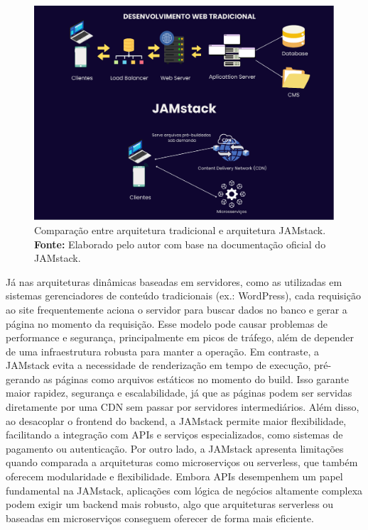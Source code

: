 \begin{figure}[H]
    \centering
    \includegraphics[height=8cm, keepaspectratio]{img/arquitetura/JAM STACK.png}
    \caption{ Comparação entre arquitetura tradicional e arquitetura JAMstack. \\
        \textbf{Fonte:} Elaborado pelo autor com base na documentação oficial do JAMstack.}
    \label{fig:jamStack Arquitetura}
\end{figure}

Já nas arquiteturas dinâmicas baseadas em servidores, como as utilizadas em sistemas gerenciadores de conteúdo tradicionais (ex.: WordPress), cada requisição ao site frequentemente aciona o servidor para buscar dados no banco e gerar a página no momento da requisição. Esse modelo pode causar problemas de performance e segurança, principalmente em picos de tráfego, além de depender de uma infraestrutura robusta para manter a operação.
Em contraste, a JAMstack evita a necessidade de renderização em tempo de execução, pré-gerando as páginas como arquivos estáticos no momento do build. Isso garante maior rapidez, segurança e escalabilidade, já que as páginas podem ser servidas diretamente por uma CDN sem passar por servidores intermediários. Além disso, ao desacoplar o frontend do backend, a JAMstack permite maior flexibilidade, facilitando a integração com APIs e serviços especializados, como sistemas de pagamento ou autenticação.
Por outro lado, a JAMstack apresenta limitações quando comparada a arquiteturas como microserviços ou serverless, que também oferecem modularidade e flexibilidade. Embora APIs desempenhem um papel fundamental na JAMstack, aplicações com lógica de negócios altamente complexa podem exigir um backend mais robusto, algo que arquiteturas serverless ou baseadas em microserviços conseguem oferecer de forma mais eficiente.

